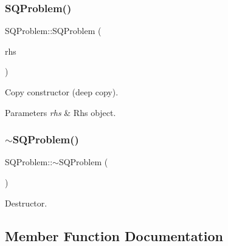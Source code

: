 \subsubsection{\texorpdfstring{S\+Q\+Problem()}{SQProblem()}\hspace{0.1cm}{\footnotesize\ttfamily [3/3]}}
{\footnotesize\ttfamily S\+Q\+Problem\+::\+S\+Q\+Problem (\begin{DoxyParamCaption}\item[{const \hyperlink{class_s_q_problem}{S\+Q\+Problem} \&}]{rhs }\end{DoxyParamCaption})}

Copy constructor (deep copy). 
\begin{DoxyParams}{Parameters}
{\em rhs} & Rhs object. \\
\hline
\end{DoxyParams}
\mbox{\label{class_s_q_problem_a65cb28afd5651a23856c37f644155f31}} 
\subsubsection{\texorpdfstring{$\sim$\+S\+Q\+Problem()}{~SQProblem()}}
{\footnotesize\ttfamily S\+Q\+Problem\+::$\sim$\+S\+Q\+Problem (\begin{DoxyParamCaption}{ }\end{DoxyParamCaption})\hspace{0.3cm}{\ttfamily [virtual]}}

Destructor. 

\subsection{Member Function Documentation}
\mbox{\label{class_s_q_problem_ae68c5aac86779666981cf2b4e3fb7d64}} 
